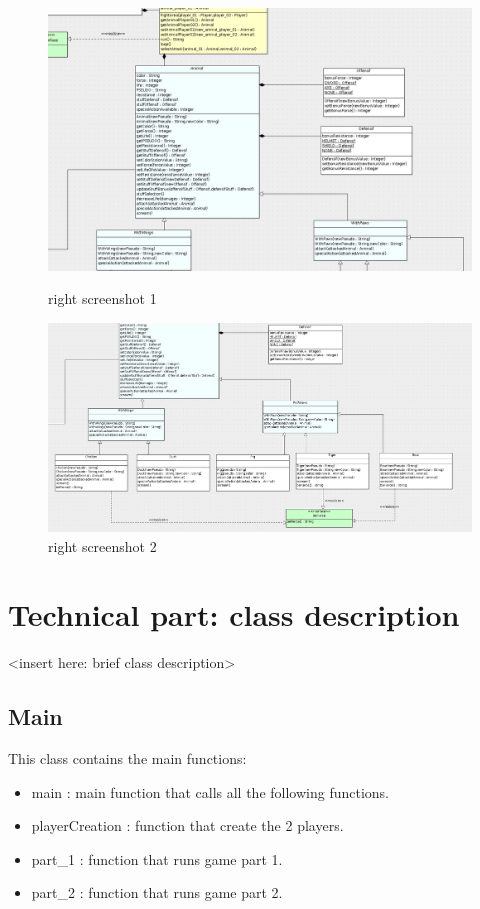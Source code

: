 \begin{figure}
  \includegraphics[width=450pt]{../../Images/2_2-3_2-3_3.png}
  \caption{\small right screenshot 1}
  \includegraphics[width=450pt]{../../Images/2_3-3_3.png}
  \caption{\small right screenshot 2}
\end{figure}

\section{Technical part: class description}

<insert here: brief class description>

\subsection{Main}

This class contains the main functions:

\begin{itemize}
 \item main : main function that calls all the following functions.
 \item playerCreation : function that create the 2 players.
 \item part\_1 : function that runs game part 1.
 \item part\_2 : function that runs game part 2.
\end{itemize}


